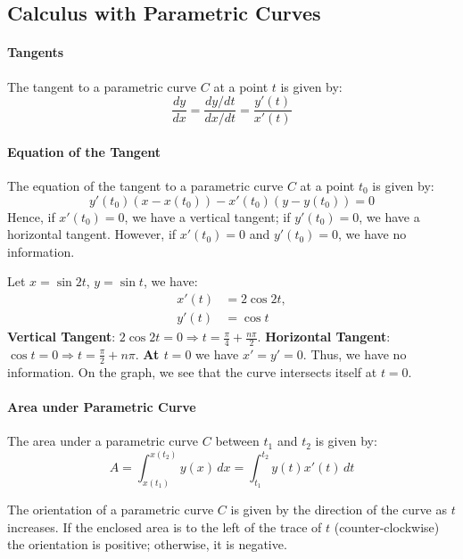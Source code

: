 \documentclass[11pt]{article}
\begin{document}
\subsection{Calculus with Parametric Curves}
\paragraph{Tangents} The tangent to a parametric curve $C$ at a point $t$ is given by:
\begin{equation}
    \frac{dy}{dx} = \frac{dy/dt}{dx/dt} = \frac{y'(t)}{x'(t)}
\end{equation}
\paragraph{Equation of the Tangent} The equation of the tangent to a parametric curve $C$ at a point $t_0$ is given by:
\begin{equation}
    y'(t_0) (x-x(t_0)) - x'(t_0) (y-y(t_0)) = 0
\end{equation}
Hence, if $x'(t_0) = 0$, we have a vertical tangent; if $y'(t_0) = 0$, we have a horizontal tangent. However, if $x'(t_0) = 0$ and $y'(t_0) = 0$, we have no information.
\begin{example}
    Let $x = \sin 2t$, $y = \sin t$, we have:
    \begin{align*}
        x'(t) &= 2\cos 2t, \\
        y'(t) &= \cos t
    \end{align*}
    \textbf{Vertical Tangent}: $2\cos 2t = 0 \Rightarrow t = \frac{\pi}{4} + \frac{n\pi}{2}$.
    \textbf{Horizontal Tangent}: $\cos t = 0 \Rightarrow t = \frac{\pi}{2} + n\pi$.
    \textbf{At $t = 0$} we have $x' = y' = 0$. Thus, we have no information. On the graph, we see that the curve intersects itself at $t = 0$.
\end{example}
\paragraph{Area under Parametric Curve} The area under a parametric curve $C$ between $t_1$ and $t_2$ is given by:
\begin{equation}
    A = \int^{x(t_2)}_{x(t_1)} y(x) \, dx = \int_{t_1}^{t_2} y(t) x'(t) \, dt 
\end{equation}
\begin{definition}[Orientation]
    The orientation of a parametric curve $C$ is given by the direction of the curve as $t$ increases. If the enclosed area is to the left of the trace of $t$ (counter-clockwise) the orientation is positive; otherwise, it is negative.
\end{definition}
\end{document}
